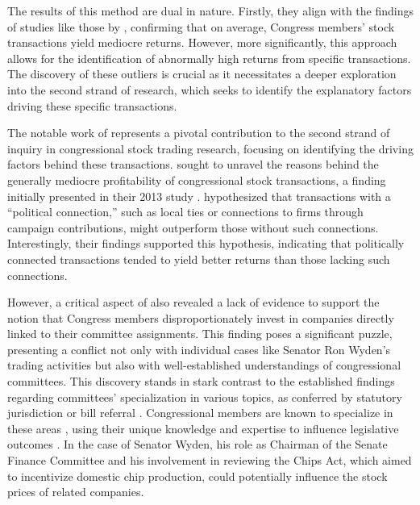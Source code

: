 \documentclass[15pt,letterpaper]{article}
\begin{document}
The results of this method are dual in nature. Firstly, they align with the findings of studies like those by \cite{eg13}, confirming that on average, Congress members' stock transactions yield mediocre returns. However, more significantly, this approach allows for the identification of abnormally high returns from specific transactions. The discovery of these outliers is crucial as it necessitates a deeper exploration into the second strand of research, which seeks to identify the explanatory factors driving these specific transactions. 


The notable work of \cite{eg14} represents a pivotal contribution to the second strand of inquiry in congressional stock trading research, focusing on identifying the driving factors behind these transactions. \cite{eg14} sought to unravel the reasons behind the generally mediocre profitability of congressional stock transactions, a finding initially presented in their 2013 study \citep{eg13}. \cite{eg14} hypothesized that transactions with a “political connection,” such as local ties or connections to firms through campaign contributions, might outperform those without such connections. Interestingly, their findings supported this hypothesis, indicating that politically connected transactions tended to yield better returns than those lacking such connections.

However, a critical aspect of \cite{eg14} also revealed a lack of evidence to support the notion that Congress members disproportionately invest in companies directly linked to their committee assignments. This finding poses a significant puzzle, presenting a conflict not only with individual cases like Senator Ron Wyden's trading activities but also with well-established understandings of congressional committees. This discovery stands in stark contrast to the established findings regarding committees’ specialization in various topics, as conferred by statutory jurisdiction \citep{myers2009} or bill referral \citep{king1994}. Congressional members are known to specialize in these areas \citep{Asher1974CommitteesAT}, using their unique knowledge and expertise to influence legislative outcomes \citep{10.2307/40709444, 10.2307/2111156, kiewiet1991logic, krehbiel1992information, curry2018knowledge}. In the case of Senator Wyden, his role as Chairman of the Senate Finance Committee and his involvement in reviewing the Chips Act, which aimed to incentivize domestic chip production, could potentially influence the stock prices of related companies.
\end{document}
